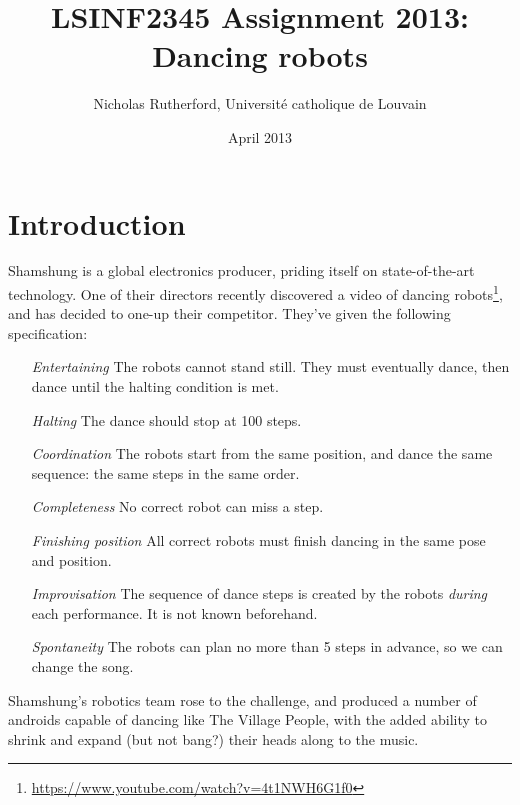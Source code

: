 \documentclass[a4paper]{article}
\title{LSINF2345 Assignment 2013: Dancing robots}
\author{Nicholas Rutherford, Université catholique de Louvain}
\date{April 2013}
\begin{document}
\ifpdf
{}
\else
{}
\fi

\maketitle


\section*{Introduction}

Shamshung is a global electronics producer, priding itself on state-of-the-art
technology. One of their directors recently discovered a video of dancing
robots\footnote{\url{https://www.youtube.com/watch?v=4t1NWH6G1f0}}, and has
decided to one-up their competitor. They've given the following specification:

\begin{itemize}

  \item[\emph{Entertaining}] The robots cannot stand still. They must eventually dance, then dance until the halting condition is met.

  \item[\emph{Halting}] The dance should stop at 100 steps.

  \item[\emph{Coordination}] The robots start from the same position, and dance the same sequence: the same steps in the same order.

  \item[\emph{Completeness}] No correct robot can miss a step.

  \item[\emph{Finishing position}] All correct robots must finish dancing in the same
  pose and position.

  \item[\emph{Improvisation}] The sequence of dance steps is created by the robots
  \emph{during} each performance. It is not known beforehand.

  \item[\emph{Spontaneity}] The robots can plan no more than 5 steps in advance, so we can change the song.

\end{itemize}

Shamshung's robotics team rose to the challenge, and produced a number of
androids capable of dancing like The Village People, with the added
ability to shrink and expand (but not bang?) their heads along to the music.
\end{document}
